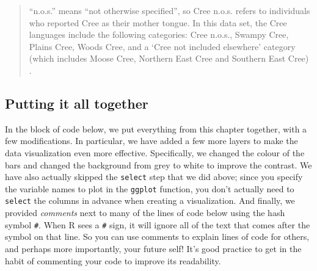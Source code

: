 \documentclass[
]{book}
\begin{document}
\begin{quote}
``n.o.s.'' means ``not otherwise specified'', so Cree n.o.s. refers to
individuals who reported Cree as their mother tongue. In this data set, the
Cree languages include the following categories: Cree n.o.s., Swampy Cree,
Plains Cree, Woods Cree, and a `Cree not included elsewhere' category (which
includes Moose Cree, Northern East Cree and Southern East Cree)
\citep{language2018}.
\end{quote}

\hypertarget{putting-it-all-together}{%
\subsection{Putting it all together}\label{putting-it-all-together}}

In the block of code below, we put everything from this chapter together, with a few
modifications. In particular, we have
added a few more layers to make the data visualization even more effective.
Specifically, we changed the colour of the bars and changed the background from
grey to white to improve the contrast. We have also actually skipped the
\texttt{select} step that we did above; since you specify the variable names to plot
in the \texttt{ggplot} function, you don't actually need to \texttt{select} the columns in advance
when creating a visualization. And finally, we provided \emph{comments} next to
many of the lines of code below using the
hash symbol \texttt{\#}. When R sees a \texttt{\#} sign,   it
will ignore all of the text that
comes after the symbol on that line. So you can use comments to explain lines
of code for others, and perhaps more importantly, your future self!
It's good practice to get in the habit of
commenting your code to improve its readability.
\end{document}
